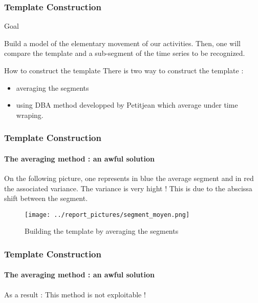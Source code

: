 \documentclass[11pt, sans, handout]{beamer}
\begin{document}
\begin{frame}
	\frametitle{Template Construction}
	
	\begin{alertblock}{Goal}

		Build a model of the elementary movement of our activities. Then, one will compare the template and a sub-segment of the time series to be recognized.

	\end{alertblock}
	
	\begin{block}{How to construct the template}
	There is two way to construct the template : 
	\begin{itemize}
		\item averaging the segments
		\item using DBA method developped by Petitjean\cite{petitjean} which average under time wraping.
	\end{itemize}	  
	\end{block}
	
\end{frame}

\begin{frame}
	\frametitle{Template Construction}
	\framesubtitle{The averaging method : an awful solution}
	
	On the following picture, one represents in blue the average segment and in red the associated variance. The variance is very hight ! This is due to the abscissa shift between the segment.
	
	\begin{figure}
	\texttt{[image: ../report\_pictures/segment\_moyen.png]}
	\caption{Building the template by averaging the segments}
	\end{figure}
	
\end{frame}

\begin{frame}
	\frametitle{Template Construction}
	\framesubtitle{The averaging method : an awful solution}
	
	\begin{alertblock}{As a result :}
	This method is not exploitable !
	\end{alertblock}

\end{frame}
\end{document}
